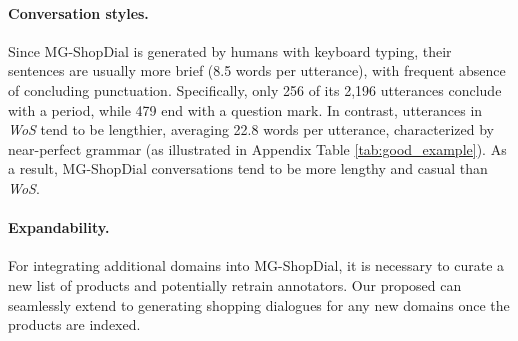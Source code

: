 
\vspace{-0.5em}
\paragraph{Conversation styles.} Since MG-ShopDial is generated by humans with keyboard typing, their sentences are usually more brief (8.5 words per utterance), with frequent absence of concluding punctuation. Specifically, only 256 of its 2,196 utterances conclude with a period, while 479 end with a question mark.  
In contrast, utterances in \textit{WoS} tend to be lengthier, averaging 22.8 words per utterance, characterized by near-perfect grammar (as illustrated in Appendix Table \ref{tab:good_example}). %
As a result, MG-ShopDial conversations tend to be more lengthy and casual than \textit{WoS}.


\paragraph{Expandability.} For integrating additional domains into MG-ShopDial, it is necessary to curate a new list of products and potentially retrain annotators. Our proposed \method can seamlessly extend to generating shopping dialogues for any new domains once the products are indexed.